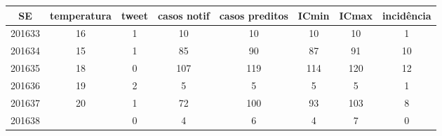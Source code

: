 \begin{tabular}{c|ccccccc}
  \hline
SE & temperatura & tweet & casos notif & casos preditos & ICmin & ICmax & incidência \\ 
  \hline
201633 & 16 & 1 & 10 & 10 & 10 & 10 & 1 \\ 
  201634 & 15 & 1 & 85 & 90 & 87 & 91 & 10 \\ 
  201635 & 18 & 0 & 107 & 119 & 114 & 120 & 12 \\ 
  201636 & 19 & 2 & 5 & 5 & 5 & 5 & 1 \\ 
  201637 & 20 & 1 & 72 & 100 & 93 & 103 & 8 \\ 
  201638 &  & 0 & 4 & 6 & 4 & 7 & 0 \\ 
   \hline
\end{tabular}
